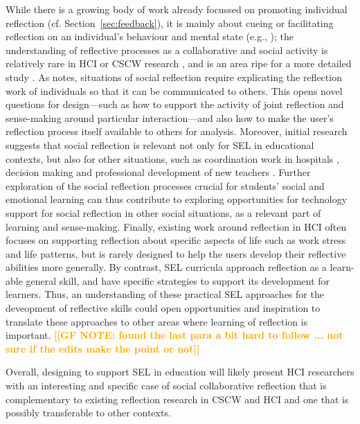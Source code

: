 \documentclass[prodmode,acmtochi]{acmsmall}
\newcommand{\Geraldine}[1]{\textrm{\textbf{\textcolor{Orange}{[[#1]]}}}}
\begin{document}
While there is a growing body of work already focussed on promoting individual reflection (cf. Section~\ref{sec:feedback}), it is mainly about cueing or facilitating reflection on an individual's behaviour and mental state (e.g., \cite{Sas2011,Stahl2008,Thieme2011,Isaacs2013}); the understanding of reflective processes as a collaborative and social activity is relatively rare in HCI or CSCW research \cite{Fleck2012,Prilla2012}, and is an area ripe for a more detailed study \cite{Baumer2014,Mentis2014}. As  notes, situations of social reflection require explicating the reflection work of individuals so that it can be communicated to others. This opens novel questions for design---such as how to support the activity of joint reflection and sense-making around particular interaction---and also how to make the user's reflection process itself available to others for analysis.
%
Moreover, initial research suggests that social reflection is relevant not only for SEL in educational contexts, but also for other situations, such as coordination work in hospitals \cite{Prilla2012}, decision making \cite{Marcu2014} and professional development of new teachers \cite{Fleck2009}.  Further exploration of the social reflection processes crucial for students' social and emotional learning can thus contribute to exploring opportunities for technology support for social reflection in other social situations, as a relevant part of learning and sense-making.
%
Finally, existing work around reflection in HCI often focuses on supporting reflection about specific aspects of life such as work stress and life patterns, but is rarely designed to help the users develop their reflective abilities more generally. By contrast, SEL curricula approach reflection as a learn-able general skill, and have specific strategies to support its development for learners. Thus, an understanding of these practical SEL approaches for the deveopment of reflective skills  could open opportunities and inspiration to translate these approaches to other areas where learning of reflection is important. 
\Geraldine{GF NOTE: found the last para a bit hard to follow ... not sure if the edits make the point or not}

Overall, designing to support SEL in education will likely present HCI researchers with an interesting and specific case of social collaborative reflection that is complementary to  existing reflection research in CSCW and HCI and one that is possibly transferable to other contexts.   
\end{document}
